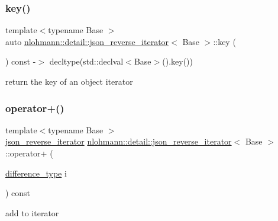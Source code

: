 \subsubsection{\texorpdfstring{key()}{key()}}
{\footnotesize\ttfamily template$<$typename Base $>$ \\
auto \hyperlink{classnlohmann_1_1detail_1_1json__reverse__iterator}{nlohmann\+::detail\+::json\+\_\+reverse\+\_\+iterator}$<$ Base $>$\+::key (\begin{DoxyParamCaption}{ }\end{DoxyParamCaption}) const -\/$>$ decltype(std\+::declval$<$Base$>$().key())
    \hspace{0.3cm}{\ttfamily [inline]}}



return the key of an object iterator 

\mbox{\label{classnlohmann_1_1detail_1_1json__reverse__iterator_aabf172b436988e2edde22f13f27caaed}} 
\subsubsection{\texorpdfstring{operator+()}{operator+()}}
{\footnotesize\ttfamily template$<$typename Base $>$ \\
\hyperlink{classnlohmann_1_1detail_1_1json__reverse__iterator}{json\+\_\+reverse\+\_\+iterator} \hyperlink{classnlohmann_1_1detail_1_1json__reverse__iterator}{nlohmann\+::detail\+::json\+\_\+reverse\+\_\+iterator}$<$ Base $>$\+::operator+ (\begin{DoxyParamCaption}\item[{\hyperlink{classnlohmann_1_1detail_1_1json__reverse__iterator_a9ab55987c05ec6427ad36082e351cc45}{difference\+\_\+type}}]{i }\end{DoxyParamCaption}) const\hspace{0.3cm}{\ttfamily [inline]}}



add to iterator 

\mbox{\label{classnlohmann_1_1detail_1_1json__reverse__iterator_aada9d2b320002ef870c5283cda2c1e9d}} 
